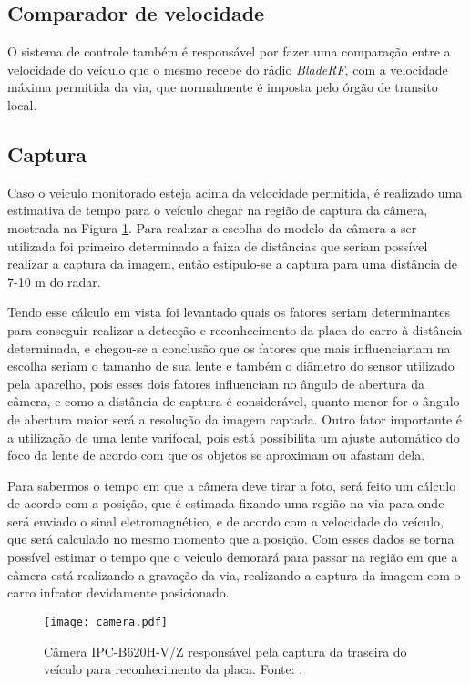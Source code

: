     \subsection{Comparador de velocidade}
    O sistema de controle também é responsável por fazer uma comparação entre a velocidade do veículo que o mesmo recebe do rádio \emph{BladeRF}, com a velocidade máxima permitida da via, que normalmente é imposta pelo órgão de transito local.
    \subsection{Captura}
    Caso o veiculo monitorado esteja acima da velocidade permitida, é realizado uma estimativa de tempo para o veículo chegar na região de captura da câmera, mostrada na Figura \ref{camera}.
    Para realizar a escolha do modelo da câmera a ser utilizada foi primeiro determinado a faixa de distâncias que seriam possível realizar a captura da imagem, então estipulo-se a captura para uma distância de 7-10 m do radar. \par 
    Tendo esse cálculo em vista foi levantado quais os fatores seriam determinantes para conseguir realizar a detecção e reconhecimento da placa do carro à distância determinada, e chegou-se a conclusão que os fatores que mais influenciariam na escolha seriam o tamanho de sua lente e também o diâmetro do sensor utilizado pela aparelho, pois esses dois fatores influenciam no ângulo de abertura da câmera, e como a distância de captura é considerável, quanto menor for o ângulo de abertura maior será a resolução da imagem captada. Outro fator importante é a utilização de uma lente varifocal, pois está possibilita um ajuste automático do foco da lente de acordo com que os objetos se aproximam ou afastam dela. \par
    Para sabermos o tempo em que a câmera deve tirar a foto, será feito um cálculo de acordo com a posição, que é estimada fixando uma região na via para onde será enviado o sinal eletromagnético, e de acordo com a velocidade do veículo, que  será calculado no mesmo momento que a posição. Com esses dados se torna possível estimar o tempo que o veiculo demorará para passar na região em que a câmera está realizando a gravação da via, realizando a captura da imagem com o carro infrator devidamente posicionado.
    \begin{figure}[H]
    \centering
    \texttt{[image: camera.pdf]}
    \caption{Câmera IPC-B620H-V/Z responsável pela captura da traseira do veículo para reconhecimento da placa. Fonte: \cite{camera}.}
    \label{camera}
\end{figure}
